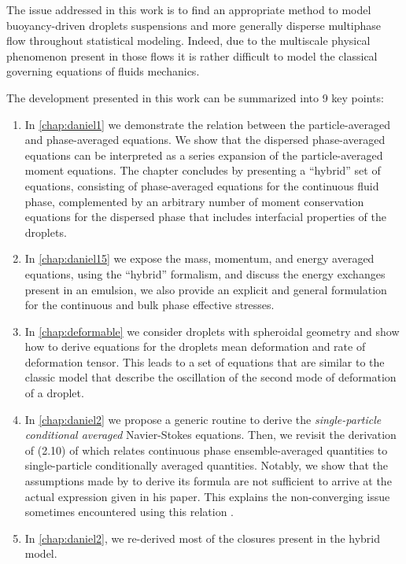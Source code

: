 
The issue addressed in this work is to find an appropriate method to model buoyancy-driven droplets suspensions and more generally disperse multiphase flow throughout statistical modeling.
Indeed, due to the multiscale physical phenomenon present in those flows it is rather difficult to model the classical governing equations of fluids mechanics.  

The development presented in this work can be summarized into 9 key points:
\begin{enumerate}
    \item In \ref{chap:daniel1} 
    we demonstrate the relation between the particle-averaged and phase-averaged equations. 
    We show that the dispersed phase-averaged equations can be interpreted as a series expansion of the particle-averaged moment equations. 
    The chapter concludes by presenting a ``hybrid'' set of equations, consisting of phase-averaged equations for the continuous fluid phase, complemented by an arbitrary number of moment conservation equations for the dispersed phase that includes interfacial properties of the droplets.
    \item In \ref{chap:daniel15} we expose the mass, momentum, and energy averaged equations, using the ``hybrid'' formalism, and discuss the energy exchanges present in an emulsion, we also provide an explicit and general formulation for the continuous and bulk phase effective stresses.
    \item In \ref{chap:deformable} we consider droplets with spheroidal geometry and show how to derive equations for the droplets mean deformation and rate of deformation tensor. 
    This leads to a set of equations that are similar to the classic model that describe the oscillation of the second mode of deformation of a droplet.
    \item     
    In \ref{chap:daniel2} we propose a generic routine to derive the \textit{single-particle conditional averaged} Navier-Stokes equations. 
    Then, we revisit the derivation of (2.10) of \citet{batchelor1972sedimentation} which relates continuous phase ensemble-averaged quantities to single-particle conditionally averaged quantities.
    Notably, we show that the assumptions made by \citet{batchelor1972sedimentation} to derive its formula are not sufficient to arrive at the actual expression given in his paper.
    This explains the non-converging issue sometimes encountered using this relation \citep{batchelor1972sedimentation}. 
    \item In \ref{chap:daniel2}, we re-derived most of the closures present in the hybrid model. 

\end{enumerate}
